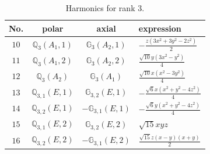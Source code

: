 \documentclass[fleqn,8pt,landscape]{jsarticle}
\begin{document}
\begin{table}[ht!]
\begin{center}
\caption{Harmonics for rank 3.}
\renewcommand{\arraystretch}{1.3}
\begin{tabular}{cccl} \hline \hline
No. & polar & axial & expression \\ \hline
$ 10 $ & $ \mathbb{Q}_{3}(A_{1},1) $ & $ \mathbb{G}_{3}(A_{2},1) $ & $ - \frac{z \left(3 x^{2} + 3 y^{2} - 2 z^{2}\right)}{2} $ \\
$ 11 $ & $ \mathbb{Q}_{3}(A_{1},2) $ & $ \mathbb{G}_{3}(A_{2},2) $ & $ \frac{\sqrt{10} y \left(3 x^{2} - y^{2}\right)}{4} $ \\
$ 12 $ & $ \mathbb{Q}_{3}(A_{2}) $ & $ \mathbb{G}_{3}(A_{1}) $ & $ \frac{\sqrt{10} x \left(x^{2} - 3 y^{2}\right)}{4} $ \\
$ 13 $ & $ \mathbb{Q}_{3,1}(E,1) $ & $ \mathbb{G}_{3,2}(E,1) $ & $ - \frac{\sqrt{6} x \left(x^{2} + y^{2} - 4 z^{2}\right)}{4} $ \\
$ 14 $ & $ \mathbb{Q}_{3,2}(E,1) $ & $ -\mathbb{G}_{3,1}(E,1) $ & $ - \frac{\sqrt{6} y \left(x^{2} + y^{2} - 4 z^{2}\right)}{4} $ \\
$ 15 $ & $ \mathbb{Q}_{3,1}(E,2) $ & $ \mathbb{G}_{3,2}(E,2) $ & $ \sqrt{15} x y z $ \\
$ 16 $ & $ \mathbb{Q}_{3,2}(E,2) $ & $ -\mathbb{G}_{3,1}(E,2) $ & $ \frac{\sqrt{15} z \left(x - y\right) \left(x + y\right)}{2} $ \\
 \hline \hline
\end{tabular}
\end{center}
\end{table}
\end{document}
